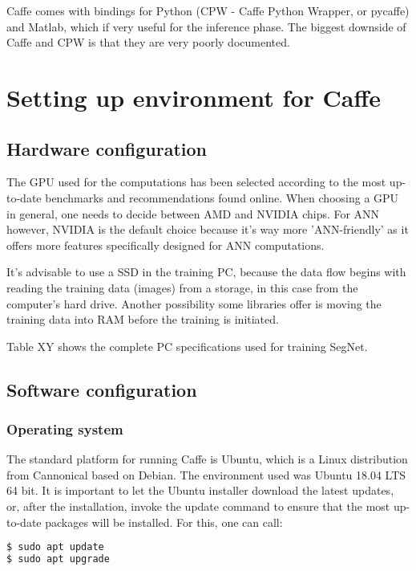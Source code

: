 Caffe comes with bindings for Python (CPW - Caffe Python Wrapper, or pycaffe) and Matlab, which if very useful for the inference phase. The biggest downside of Caffe and CPW is that they are very poorly documented.

\section{Setting up environment for Caffe}

\subsection{Hardware configuration}

The GPU used for the computations has been selected according to the most up-to-date benchmarks and recommendations found online. When choosing a GPU in general, one needs to decide between AMD and NVIDIA chips. For ANN however, NVIDIA is the default choice because it's way more 'ANN-friendly' as it offers more features specifically designed for ANN computations. 

It's advisable to use a SSD in the training PC, because the data flow begins with reading the training data (images) from a storage, in this case from the computer's hard drive. Another possibility some libraries offer is moving the training data into RAM before the training is initiated. 

Table XY shows the complete PC specifications used for training SegNet. 

\newpage
\subsection{Software configuration} 

\subsubsection{Operating system} 

The standard platform for running Caffe is Ubuntu, which is a Linux distribution from Cannonical based on Debian. The environment used was Ubuntu 18.04 LTS 64 bit. It is important to let the Ubuntu installer download the latest updates, or, after the installation, invoke the update command to ensure that the most up-to-date packages will be installed. For this, one can call:

\begin{lstlisting}[language=bash]
$ sudo apt update
$ sudo apt upgrade
\end{lstlisting}

